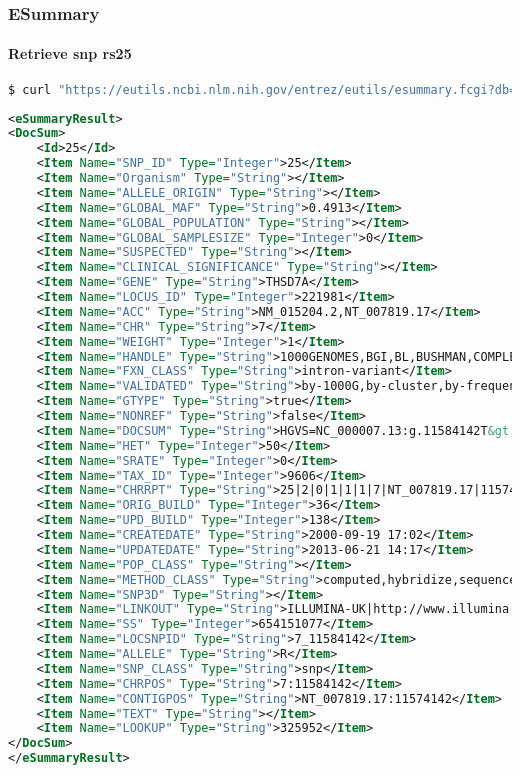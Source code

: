 \documentclass{beamer}
\begin{document}
\begin{frame}[fragile]
\frametitle{ESummary}
\framesubtitle{Retrieve snp rs25}
\begin{lstlisting}[language=bash,basicstyle=\tiny,breaklines=true]
$ curl "https://eutils.ncbi.nlm.nih.gov/entrez/eutils/esummary.fcgi?db=snp&id=25"
\end{lstlisting}

\begin{lstlisting}[language=xml,basicstyle=\tiny,breaklines=false]
<eSummaryResult>
<DocSum>
	<Id>25</Id>
	<Item Name="SNP_ID" Type="Integer">25</Item>
	<Item Name="Organism" Type="String"></Item>
	<Item Name="ALLELE_ORIGIN" Type="String"></Item>
	<Item Name="GLOBAL_MAF" Type="String">0.4913</Item>
	<Item Name="GLOBAL_POPULATION" Type="String"></Item>
	<Item Name="GLOBAL_SAMPLESIZE" Type="Integer">0</Item>
	<Item Name="SUSPECTED" Type="String"></Item>
	<Item Name="CLINICAL_SIGNIFICANCE" Type="String"></Item>
	<Item Name="GENE" Type="String">THSD7A</Item>
	<Item Name="LOCUS_ID" Type="Integer">221981</Item>
	<Item Name="ACC" Type="String">NM_015204.2,NT_007819.17</Item>
	<Item Name="CHR" Type="String">7</Item>
	<Item Name="WEIGHT" Type="Integer">1</Item>
	<Item Name="HANDLE" Type="String">1000GENOMES,BGI,BL,BUSHMAN,COMPLETE_GENOMICS,CSHL-HAPMAP,GMI,ILLUMINA-UK,KWOK,PERLEGEN,SSMP,TISHKOFF</Item>
	<Item Name="FXN_CLASS" Type="String">intron-variant</Item>
	<Item Name="VALIDATED" Type="String">by-1000G,by-cluster,by-frequency,by-hapmap</Item>
	<Item Name="GTYPE" Type="String">true</Item>
	<Item Name="NONREF" Type="String">false</Item>
	<Item Name="DOCSUM" Type="String">HGVS=NC_000007.13:g.11584142T&gt;C,NG_027670.1:g.292683A&gt;G,NM_015204.2:c.1454-1398A&gt;G,NT_007819.17:g.11574142T&gt;C|SEQ=TCTGTGAGCTTCTGCATGCAATCCT[A/G]TGCAATTGGAATTTGATAGTCCTTT|GENE=THSD7A:221981</Item>
	<Item Name="HET" Type="Integer">50</Item>
	<Item Name="SRATE" Type="Integer">0</Item>
	<Item Name="TAX_ID" Type="Integer">9606</Item>
	<Item Name="CHRRPT" Type="String">25|2|0|1|1|1|7|NT_007819.17|11574141|11584142|THSD7A|0.499848|0.00872267| |51|1|1|36|138|0| | |T:2178:0.4913</Item>
	<Item Name="ORIG_BUILD" Type="Integer">36</Item>
	<Item Name="UPD_BUILD" Type="Integer">138</Item>
	<Item Name="CREATEDATE" Type="String">2000-09-19 17:02</Item>
	<Item Name="UPDATEDATE" Type="String">2013-06-21 14:17</Item>
	<Item Name="POP_CLASS" Type="String"></Item>
	<Item Name="METHOD_CLASS" Type="String">computed,hybridize,sequence,unknown</Item>
	<Item Name="SNP3D" Type="String"></Item>
	<Item Name="LINKOUT" Type="String">ILLUMINA-UK|http://www.illumina.com/HumanGenomeNA18507_000019106_NCBI36.1_chr7_11550667</Item>
	<Item Name="SS" Type="Integer">654151077</Item>
	<Item Name="LOCSNPID" Type="String">7_11584142</Item>
	<Item Name="ALLELE" Type="String">R</Item>
	<Item Name="SNP_CLASS" Type="String">snp</Item>
	<Item Name="CHRPOS" Type="String">7:11584142</Item>
	<Item Name="CONTIGPOS" Type="String">NT_007819.17:11574142</Item>
	<Item Name="TEXT" Type="String"></Item>
	<Item Name="LOOKUP" Type="String">325952</Item>
</DocSum>
</eSummaryResult>
\end{lstlisting}
\end{frame}
\end{document}
